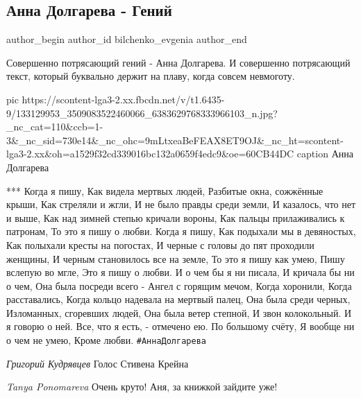  
 
 
 
 
 
\subsection{Анна Долгарева - Гений}
\label{sec:27_12_2020.fb.bilchenko_evgenia.4.anna_dolgareva_genij}
\ifcmt
 author_begin
   author_id bilchenko_evgenia
 author_end
\fi

Совершенно потрясающий гений - Анна Долгарева. И совершенно потрясающий текст,
который буквально держит на плаву, когда совсем невмоготу. 

\ifcmt
  pic https://scontent-lga3-2.xx.fbcdn.net/v/t1.6435-9/133129953_3509083522460066_6383629768333966103_n.jpg?_nc_cat=110&ccb=1-3&_nc_sid=730e14&_nc_ohc=9mLtxeaBeFEAX8ET9OJ&_nc_ht=scontent-lga3-2.xx&oh=a1529f32cd339016bc132a0659f4edc9&oe=60CB44DC
	caption Анна Долгарева
\fi

***
Когда я пишу,
Как видела мертвых людей,
Разбитые окна, сожжённые крыши,
Как стреляли и жгли,
И не было правды среди земли,
И казалось, что нет и выше,
Как над зимней степью кричали вороны,
Как пальцы прилаживались к патронам,
То это я пишу о любви.
Когда я пишу,
Как подыхали мы в девяностых,
Как полыхали кресты на погостах,
И черные с головы до пят проходили женщины,
И черным становилось все на земле,
То это я пишу как умею,
Пишу вслепую во мгле,
Это я пишу о любви.
И о чем бы я ни писала,
И кричала бы ни о чем,
Она была посреди всего -
Ангел с горящим мечом,
Когда хоронили,
Когда расставались,
Когда кольцо надевала на мертвый палец,
Она была среди черных,
Изломанных, сгоревших людей,
Она была ветер степной,
И звон колокольный.
И я говорю о ней.
Все, что я есть, - отмечено ею.
По большому счёту,
Я вообще ни о чем не умею,
Кроме любви.
\verb|#АннаДолгарева|

\emph{Григорий Кудрявцев}
Голос Стивена Крейна

\emph{Tanya Ponomareva}
Очень круто! Аня, за книжкой зайдите уже!

